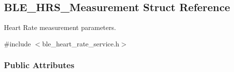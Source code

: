 \hypertarget{struct_b_l_e___h_r_s___measurement}{}\subsection{B\+L\+E\+\_\+\+H\+R\+S\+\_\+\+Measurement Struct Reference}
\label{struct_b_l_e___h_r_s___measurement}


Heart Rate measurement parameters.  




{\ttfamily \#include $<$ble\+\_\+heart\+\_\+rate\+\_\+service.\+h$>$}

\subsubsection*{Public Attributes}
